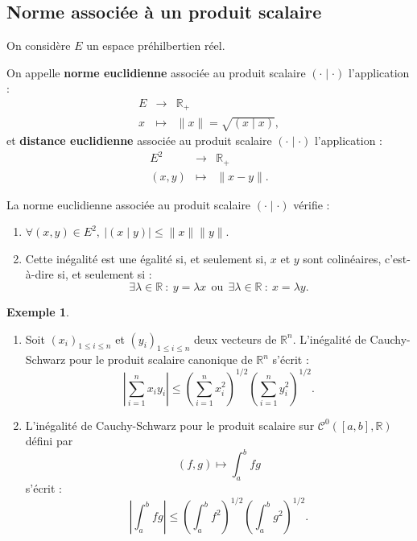 \documentclass[french]{article}
\newcommand{\R}{\mathbb{R}}
\theoremstyle{plain}
\theoremstyle{definition}
\newtheorem*{ex}{Exemple}
\theoremstyle{remark}
\begin{document}
\subsection{Norme associée à un produit scalaire}

On considère $E$ un espace préhilbertien réel.

\begin{dfn}
	On appelle \textbf{norme euclidienne} associée au produit scalaire $(\cdot\mid\cdot)$ l'application : $$\begin{array}{rcl}
		E&\longrightarrow&\R_+ \\
		x&\longmapsto&\lVert x\rVert=\sqrt{(x\mid x)},
	\end{array}$$ et \textbf{distance euclidienne} associée au produit scalaire $(\cdot\mid\cdot)$ l'application : $$\begin{array}{rcl}
	E^2&\longrightarrow&\R_+ \\
	(x,y)&\longmapsto&\lVert x-y\rVert.
	\end{array}$$
\end{dfn}

\begin{prop}
	La norme euclidienne associée au produit scalaire $(\cdot\mid\cdot)$ vérifie : 
	\begin{enumerate}
		\item $\forall (x,y)\in E^2,\ \lvert (x\mid y)\rvert\leqslant\lVert x\rVert\lVert y\rVert$.
		\item Cette inégalité est une égalité si, et seulement si, $x$ et $y$ sont colinéaires, c'est-à-dire si, et seulement si : $$\exists\lambda\in\R\ : \ y=\lambda x\ \ \text{ou}\ \ \exists\lambda\in\R\ : \ x=\lambda y.$$
	\end{enumerate}
\end{prop}

\begin{ex}
	\begin{enumerate}
		\item Soit $(x_i)_{1\leqslant i\leqslant n}$ et $(y_i)_{1\leqslant i\leqslant n}$ deux vecteurs de $\R^n$. L'inégalité de Cauchy-Schwarz pour le produit scalaire canonique de $\R^n$ s'écrit : $$\left\lvert\sum_{i=1}^{n}x_iy_i\right\rvert\leqslant\left(\sum_{i=1}^{n}x_i^2\right)^{1/2}\left(\sum_{i=1}^{n}y_i^2\right)^{1/2}.$$
		\item L'inégalité de Cauchy-Schwarz pour le produit scalaire sur $\mathcal{C}^0([a,b],\R)$ défini par $$(f,g)\mapsto\int_{a}^{b}fg$$ s'écrit : $$\left\lvert \int_{a}^{b}fg\right\rvert\leqslant\left(\int_{a}^{b}f^2\right)^{1/2}\left(\int_{a}^{b}g^2\right)^{1/2}.$$
	\end{enumerate}
\end{ex}
\end{document}
